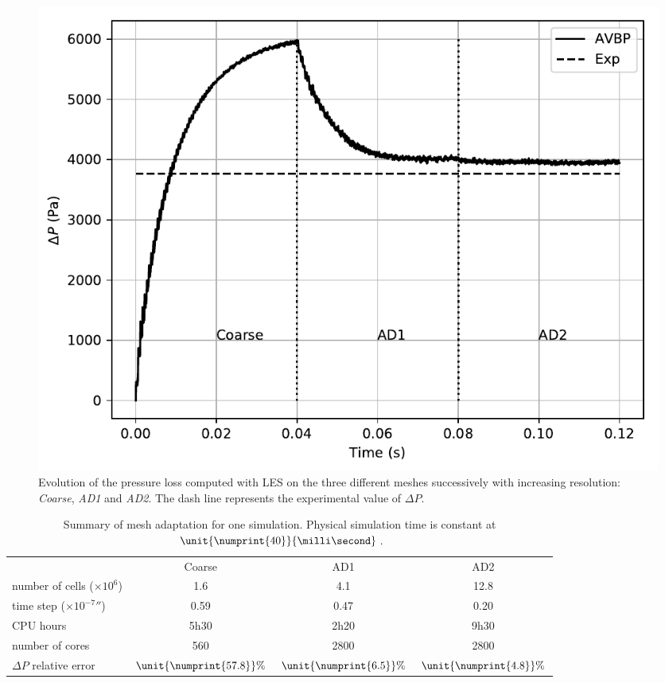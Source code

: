 \begin{figure}[!h]
\centering
\includegraphics[width=\linewidth,keepaspectratio]{fig/applications/swirler/losses_swirler_base.pdf}
\caption{Evolution of the pressure loss computed with LES on the three different meshes successively with increasing resolution: \emph{Coarse}, \emph{AD1} and \emph{AD2}. The dash line represents the experimental value of $\Delta P$.}
\label{pressure_drop_evolution}
\end{figure}


\begin{table}[!h]
\centering
\caption{Summary of mesh adaptation for one simulation. Physical simulation time is constant at $\unit{\numprint{40}}{\milli\second}$.}
\begin{tabular}{lccc}
\toprule
 & Coarse & AD1 & AD2  \\
\cmidrule{2-4}
number of cells ($\times10^6$) & 1.6 & 4.1 & 12.8 \\
time step ($\unit{\times10^{-7}}{\second}$) & 0.59 & 0.47 & 0.20\\
CPU hours & 5h30 & 2h20 & 9h30 \\
number of cores & 560 & 2800 & 2800 \\
$\Delta P$ relative error & $\unit{\numprint{57.8}}{\%}$ & $\unit{\numprint{6.5}}{\%}$ & $\unit{\numprint{4.8}}{\%}$\\
\bottomrule
\end{tabular}
\label{tab:summary-mesh}
\end{table}

